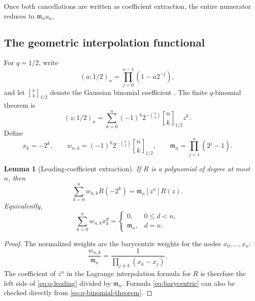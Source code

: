 \documentclass[11pt,oneside]{article}
\newtheorem{lemma}[theorem]{Lemma}
\theoremstyle{definition}
\theoremstyle{remark}
\newcommand{\qbinom}[3]{\genfrac{[}{]}{0pt}{}{#1}{#2}_{#3}}
\newcommand{\M}{\mathfrak m}
\begin{document}
Once both cancellations are written as coefficient extraction, the entire numerator reduces
to $\M_na_n$.

\subsection{The geometric interpolation functional}

For $q=1/2$, write
\begin{equation}
 (a;1/2)_n=\prod_{j=0}^{n-1}(1-a2^{-j}),                    \label{eq:qpoch}
\end{equation}
and let $\qbinom nk{1/2}$ denote the Gaussian binomial coefficient
\cite{andrews1976,gasper2004,kac2002,dlmf17}.  The finite
$q$-binomial theorem is
\begin{equation}
 (z;1/2)_n=\sum_{k=0}^n
 (-1)^k2^{-\binom k2}\qbinom nk{1/2}z^k.                   \label{eq:q-binomial-theorem}
\end{equation}
Define
\begin{equation}
 x_k=-2^k,
 \qquad
 w_{n,k}=(-1)^k2^{-\binom k2}\qbinom nk{1/2},
 \qquad
 \M_n=\prod_{j=1}^n(2^j-1).                                \label{eq:q-weights}
\end{equation}

\begin{lemma}[Leading-coefficient extraction]
\label{lem:q-leading}
If $R$ is a polynomial of degree at most $n$, then
\begin{equation}
 \sum_{k=0}^nw_{n,k}R(-2^k)=\M_n[z^n]R(z).                 \label{eq:q-leading}
\end{equation}
Equivalently,
\begin{equation}
 \sum_{k=0}^nw_{n,k}x_k^d=
 \begin{cases}
 0,&0\le d<n,\\
 \M_n,&d=n.
 \end{cases}                                                \label{eq:q-monomials}
\end{equation}
\end{lemma}

\begin{proof}
The normalized weights are the barycentric weights for the nodes
$x_0,\ldots,x_n$:
\begin{equation}
 \frac{w_{n,k}}{\M_n}=\frac1{\prod_{j\ne k}(x_k-x_j)}.      \label{eq:barycentric}
\end{equation}
The coefficient of $z^n$ in the Lagrange interpolation formula for $R$ is therefore the left
side of \eqref{eq:q-leading} divided by $\M_n$.  Formula \eqref{eq:barycentric} can also be
checked directly from \eqref{eq:q-binomial-theorem}.
\end{proof}
\end{document}
